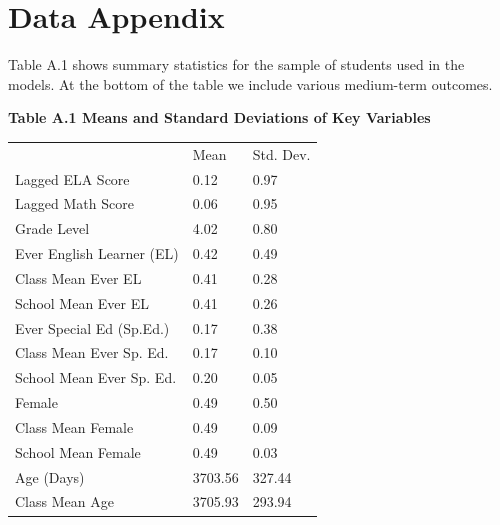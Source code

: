 \documentclass[12pt]{article}
\theoremstyle{definition}
\theoremstyle{definition}
\theoremstyle{definition}
\theoremstyle{definition}
\begin{document}
\renewcommand\thefigure{\thesection.\arabic{figure}}  
\renewcommand\thetable{\thesection.\arabic{table}}  
\setcounter{figure}{0}  
\setcounter{table}{0}  


\appendix


\section{Data Appendix} \label{data_app}
Table A.1 shows summary statistics for the sample of students used in the models. At the bottom of the table we include various medium-term outcomes.


\textbf{Table A.1 Means and Standard Deviations of Key Variables}

\begin{table}[]
\begin{tabular}{lll}
                                                        & Mean    & Std. Dev. \\
Lagged ELA Score                                        & 0.12    & 0.97      \\
Lagged Math Score                                       & 0.06    & 0.95      \\
Grade Level                                             & 4.02    & 0.80      \\
Ever English Learner (EL)                               & 0.42    & 0.49      \\
Class Mean Ever EL                                      & 0.41    & 0.28      \\
School Mean Ever EL                                     & 0.41    & 0.26      \\
Ever Special Ed (Sp.Ed.)                                & 0.17    & 0.38      \\
Class Mean Ever Sp. Ed.                                 & 0.17    & 0.10      \\
School Mean Ever Sp. Ed.                                & 0.20    & 0.05      \\
Female                                                  & 0.49    & 0.50      \\
Class Mean Female                                       & 0.49    & 0.09      \\
School Mean Female                                      & 0.49    & 0.03      \\
Age (Days)                                              & 3703.56 & 327.44    \\
Class Mean Age                                          & 3705.93 & 293.94    \\

\end{tabular}
\end{table}
\end{document}
